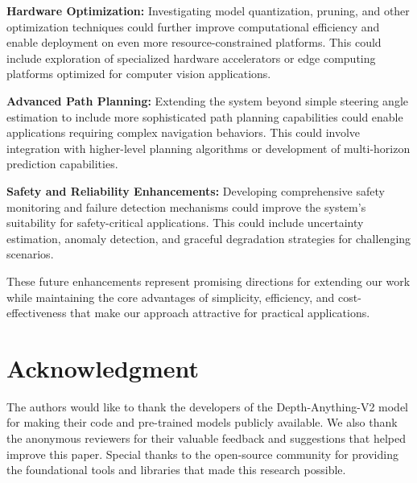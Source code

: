 \documentclass[conference]{IEEEtran}
\begin{document}
\textbf{Hardware Optimization:} Investigating model quantization, pruning, and other optimization techniques could further improve computational efficiency and enable deployment on even more resource-constrained platforms. This could include exploration of specialized hardware accelerators or edge computing platforms optimized for computer vision applications.

\textbf{Advanced Path Planning:} Extending the system beyond simple steering angle estimation to include more sophisticated path planning capabilities could enable applications requiring complex navigation behaviors. This could involve integration with higher-level planning algorithms or development of multi-horizon prediction capabilities.

\textbf{Safety and Reliability Enhancements:} Developing comprehensive safety monitoring and failure detection mechanisms could improve the system's suitability for safety-critical applications. This could include uncertainty estimation, anomaly detection, and graceful degradation strategies for challenging scenarios.

These future enhancements represent promising directions for extending our work while maintaining the core advantages of simplicity, efficiency, and cost-effectiveness that make our approach attractive for practical applications.

\section*{Acknowledgment}
The authors would like to thank the developers of the Depth-Anything-V2 model for making their code and pre-trained models publicly available. We also thank the anonymous reviewers for their valuable feedback and suggestions that helped improve this paper. Special thanks to the open-source community for providing the foundational tools and libraries that made this research possible.
\end{document}
